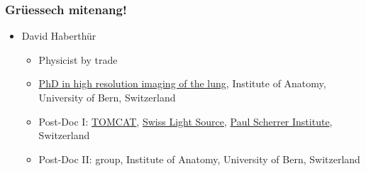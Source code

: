 \makeatletter
\newdimen\progressbar@height
\progressbar@height=1.36mm
%
\makeatother

%


\begin{frame}
  \maketitle
\end{frame}

\begin{frame}
  \frametitle{Grüessech mitenang!}
  \begin{itemize}
    \item David Haberthür
      \begin{itemize}
        \item Physicist by trade
        \item \href{https://boris.unibe.ch/2619/}{PhD in high resolution imaging of the lung}, Institute of Anatomy, University of Bern, Switzerland
        \item Post-Doc I: \href{https://www.psi.ch/sls/tomcat/}{TOMCAT}, \href{https://www.psi.ch/sls/}{Swiss Light Source}, \href{https://www.psi.ch/}{Paul Scherrer Institute}, Switzerland
        \item Post-Doc II: \uct group, Institute of Anatomy, University of Bern, Switzerland
      \end{itemize}
  \end{itemize}
\end{frame}

